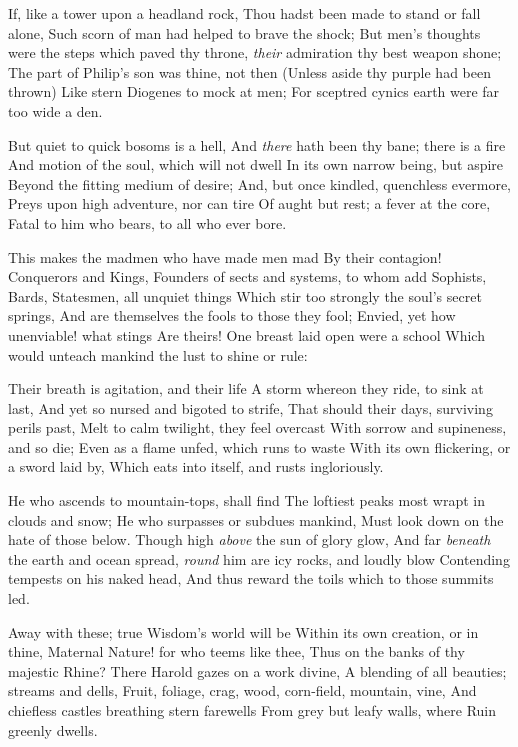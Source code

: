 \documentclass[10pt,twocolumn]{book}
\begin{document}
   If, like a tower upon a headland rock,
   Thou hadst been made to stand or fall alone,
   Such scorn of man had helped to brave the shock;
   But men's thoughts were the steps which paved thy throne,
   \textit{their} admiration thy best weapon shone;
   The part of Philip's son was thine, not then
   (Unless aside thy purple had been thrown)
   Like stern Diogenes to mock at men;
For sceptred cynics earth were far too wide a den.


   But quiet to quick bosoms is a hell,
   And \textit{there} hath been thy bane; there is a fire
   And motion of the soul, which will not dwell
   In its own narrow being, but aspire
   Beyond the fitting medium of desire;
   And, but once kindled, quenchless evermore,
   Preys upon high adventure, nor can tire
   Of aught but rest; a fever at the core,
Fatal to him who bears, to all who ever bore.


   This makes the madmen who have made men mad
   By their contagion!  Conquerors and Kings,
   Founders of sects and systems, to whom add
   Sophists, Bards, Statesmen, all unquiet things
   Which stir too strongly the soul's secret springs,
   And are themselves the fools to those they fool;
   Envied, yet how unenviable! what stings
   Are theirs!  One breast laid open were a school
Which would unteach mankind the lust to shine or rule:


   Their breath is agitation, and their life
   A storm whereon they ride, to sink at last,
   And yet so nursed and bigoted to strife,
   That should their days, surviving perils past,
   Melt to calm twilight, they feel overcast
   With sorrow and supineness, and so die;
   Even as a flame unfed, which runs to waste
   With its own flickering, or a sword laid by,
Which eats into itself, and rusts ingloriously.


   He who ascends to mountain-tops, shall find
   The loftiest peaks most wrapt in clouds and snow;
   He who surpasses or subdues mankind,
   Must look down on the hate of those below.
   Though high \textit{above} the sun of glory glow,
   And far \textit{beneath} the earth and ocean spread,
   \textit{round} him are icy rocks, and loudly blow
   Contending tempests on his naked head,
And thus reward the toils which to those summits led.


   Away with these; true Wisdom's world will be
   Within its own creation, or in thine,
   Maternal Nature! for who teems like thee,
   Thus on the banks of thy majestic Rhine?
   There Harold gazes on a work divine,
   A blending of all beauties; streams and dells,
   Fruit, foliage, crag, wood, corn-field, mountain, vine,
   And chiefless castles breathing stern farewells
From grey but leafy walls, where Ruin greenly dwells.
\end{document}

